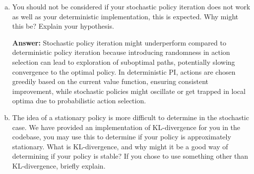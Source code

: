 \documentclass{article}
\newenvironment{answer}{{\bf Answer:} \sf }{}%
\begin{document}
\begin{enumerate}[a)]
    \item You should not be considered if your stochastic policy iteration does not work as well as your deterministic implementation, this is expected. Why might this be? Explain your hypothesis.
    
    \begin{answer}
    Stochastic policy iteration might underperform compared to deterministic policy iteration because introducing randomness in action selection can lead to exploration of suboptimal paths, potentially slowing convergence to the optimal policy. In deterministic PI, actions are chosen greedily based on the current value function, ensuring consistent improvement, while stochastic policies might oscillate or get trapped in local optima due to probabilistic action selection.
    \end{answer}

    \item The idea of a stationary policy is more difficult to determine in the stochastic case. We have provided an implementation of KL-divergence for you in the codebase, you may use this to determine if your policy is approximately stationary. What is KL-divergence, and why might it be a good way of determining if your policy is stable? If you chose to use something other than KL-divergence, briefly explain.


\end{enumerate}
\end{document}
